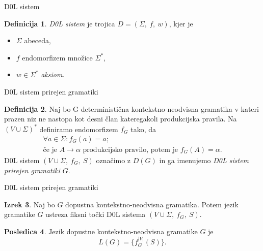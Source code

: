 \documentclass{beamer}
\theoremstyle{definition} %
\newtheorem{definicija}{Definicija}[section]
\newtheorem{izrek}[definicija]{Izrek}
\newtheorem{posledica}[definicija]{Posledica}
\begin{document}
\begin{frame}{D0L sistem}
    \begin{definicija}
        \textit{D0L sistem} je trojica $ D = (\Sigma, \ f, \ w) $, kjer je
        \begin{itemize}
            \item<2-> $ \Sigma $ abeceda,
            \item<3-> $ f $ endomorfizem množice $ \Sigma^* $,
            \item<4-> $ w \in \Sigma^* $ \textit{aksiom}.
        \end{itemize}
        \pause
    \end{definicija}
\end{frame}

\begin{frame}{D0L sistem prirejen gramatiki}
    \begin{definicija}
        Naj bo G deterministična kontekstno-neodvisna gramatika v kateri prazen niz ne nastopa kot desni član kateregakoli
        produkcijska pravila. Na $ (V \cup \Sigma)^* $ definiramo endomorfizem $ f_G $ tako, da 
        \begin{gather*}
            \forall a \in \Sigma \colon f_G(a) = a; \\
            \text{če je } A \rightarrow \alpha \text{ produkcijsko pravilo, potem je } f_G(A) = \alpha.
        \end{gather*}
        \pause
        D0L sistem $ (V \cup \Sigma, \ f_G, \ S) $ označimo z $ D(G) $ in ga imenujemo \textit{D0L sistem prirejen gramatiki $G$}.
    \end{definicija}
\end{frame}

\begin{frame}{D0L sistem prirejen gramatiki}
    \begin{izrek}
        Naj bo $G$ dopustna kontekstno-neodvisna gramatika.
        Potem jezik gramatike $G$ ustreza fiksni točki D0L sistema $ (V \cup \Sigma, \ f_G, \ S) $.
    \end{izrek}
    \pause
    \begin{posledica}
        Jezik dopustne kontekstno-neodvisna gramatike $G$ je
        \[
            L(G) = \{f_G^{|V|}(S) \}.
        \]
    \end{posledica}
\end{frame}
\end{document}
